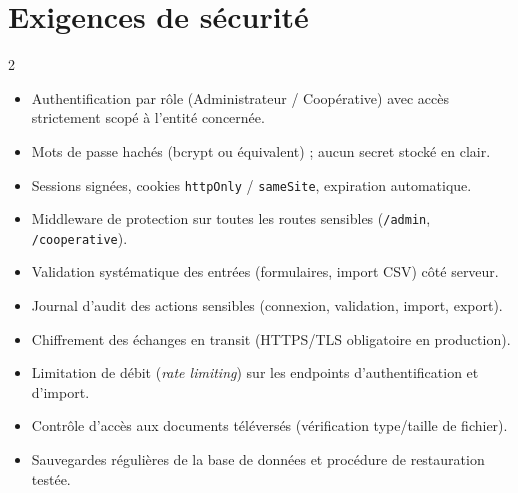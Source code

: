 \documentclass[11pt,a4paper]{article}
\begin{document}
\section{Exigences de sécurité}
\begin{infobox}
\begin{multicols}{2}
\begin{itemize}
  \item Authentification par rôle (Administrateur / Coopérative) avec accès strictement scopé à l'entité concernée.
  \item Mots de passe hachés (bcrypt ou équivalent) ; aucun secret stocké en clair.
  \item Sessions signées, cookies \texttt{httpOnly} / \texttt{sameSite}, expiration automatique.
  \item Middleware de protection sur toutes les routes sensibles (\texttt{/admin}, \texttt{/cooperative}).
  \item Validation systématique des entrées (formulaires, import CSV) côté serveur.
  \item Journal d'audit des actions sensibles (connexion, validation, import, export).
  \item Chiffrement des échanges en transit (HTTPS/TLS obligatoire en production).
  \item Limitation de débit (\emph{rate limiting}) sur les endpoints d'authentification et d'import.
  \item Contrôle d'accès aux documents téléversés (vérification type/taille de fichier).
  \item Sauvegardes régulières de la base de données et procédure de restauration testée.
\end{itemize}
\end{multicols}
\end{infobox}
\end{document}
